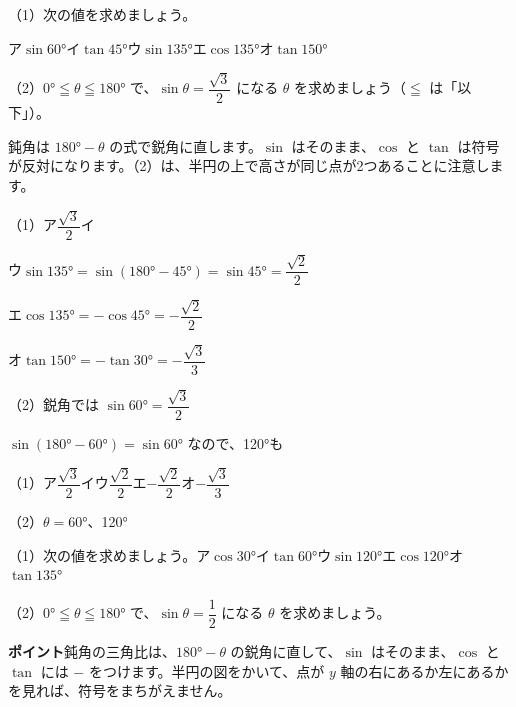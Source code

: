\begin{reidai}
（1）次の値を求めましょう。\par
\hspace*{2\zw}ア\enspace $\sin\ang{60}$\quad イ\enspace $\tan\ang{45}$\quad ウ\enspace $\sin\ang{135}$\quad エ\enspace $\cos\ang{135}$\quad オ\enspace $\tan\ang{150}$\par
（2）$\ang{0}\leqq\theta\leqq\ang{180}$ で、$\sin\theta=\dfrac{\sqrt3}{2}$ になる $\theta$ を求めましょう（$\leqq$ は「以下」）。\par
\kangaekata 鈍角は $\ang{180}-\theta$ の式で鋭角に直します。$\sin$ はそのまま、$\cos$ と $\tan$ は符号が反対になります。（2）は、半円の上で高さが同じ点が2つあることに注意します。\par
\shiki（1）ア\enspace $\dfrac{\sqrt3}{2}$\quad イ\par
\hspace*{4.6\zw}ウ\enspace $\sin\ang{135}=\sin(\ang{180}-\ang{45})=\sin\ang{45}=\dfrac{\sqrt2}{2}$\par
\hspace*{4.6\zw}エ\enspace $\cos\ang{135}=-\cos\ang{45}=-\dfrac{\sqrt2}{2}$\par
\hspace*{4.6\zw}オ\enspace $\tan\ang{150}=-\tan\ang{30}=-\dfrac{\sqrt3}{3}$\par
\hspace*{2.6\zw}（2）鋭角では $\sin\ang{60}=\dfrac{\sqrt3}{2}$\par
\hspace*{4.6\zw}$\sin(\ang{180}-\ang{60})=\sin\ang{60}$ なので、\ang{120}も\par
\kotae\mbox{（1）ア\enspace $\dfrac{\sqrt3}{2}$\quad イ\quad ウ\enspace $\dfrac{\sqrt2}{2}$\quad エ\enspace $-\dfrac{\sqrt2}{2}$\quad オ\enspace $-\dfrac{\sqrt3}{3}$}\par
\hspace*{2.6\zw}\mbox{（2）$\theta=\ang{60}$、\ang{120}}
\end{reidai}

\begin{jibun}
（1）次の値を求めましょう。\quad ア\enspace $\cos\ang{30}$\quad イ\enspace $\tan\ang{60}$\quad ウ\enspace $\sin\ang{120}$\quad エ\enspace $\cos\ang{120}$\quad オ\enspace $\tan\ang{135}$\par
（2）$\ang{0}\leqq\theta\leqq\ang{180}$ で、$\sin\theta=\dfrac{1}{2}$ になる $\theta$ を求めましょう。
\end{jibun}
\textbf{ポイント}\quad 鈍角の三角比は、$\ang{180}-\theta$ の鋭角に直して、$\sin$ はそのまま、$\cos$ と $\tan$ には $-$ をつけます。半円の図をかいて、点が $y$ 軸の右にあるか左にあるかを見れば、符号をまちがえません。

